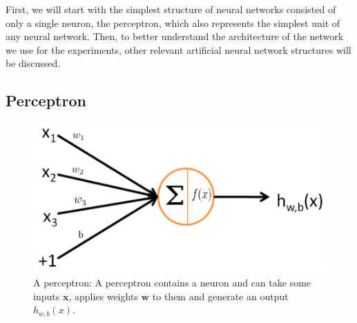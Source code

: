  First, we will start with the simplest structure of neural networks consisted of only a single neuron, the perceptron, which also represents the simplest unit of any neural network. Then, to better understand the architecture of the network we use for the experiments, other relevant artificial neural network structures will be discussed.

\subsection{Perceptron} \label{perceptron}
\begin{figure}[tbh]
  \centering
    \includegraphics[width=0.5\linewidth]{abbildungen/perceptron.png}
  \caption{A perceptron: A perceptron contains a neuron and can take some inputs $\bm{x}$, applies weights $\bm{w}$ to them and generate an output $h_{w, b}(x)$. \cite{autoencoderSparse}}
\label{fig:perceptron}
\end{figure}

